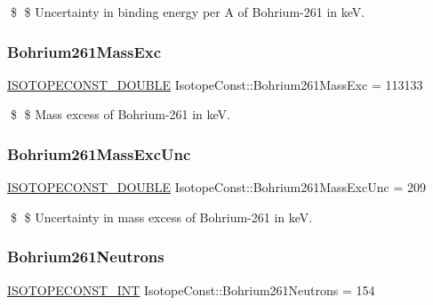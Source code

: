 \$ \$ Uncertainty in binding energy per A of Bohrium-\/261 in keV. \mbox{\label{group___isotope_const-_bohrium-_bh261_gad78b695f15affb44a9869b9024ed9f1d}} 
\subsubsection{\texorpdfstring{Bohrium261\+Mass\+Exc}{Bohrium261MassExc}}
{\footnotesize\ttfamily \mbox{\hyperlink{group___isotope_const-_macros_ga8f45a7272ce02c0b4c65c44636ed719a}{I\+S\+O\+T\+O\+P\+E\+C\+O\+N\+S\+T\+\_\+\+D\+O\+U\+B\+LE}} Isotope\+Const\+::\+Bohrium261\+Mass\+Exc = 113133}

\$ \$ Mass excess of Bohrium-\/261 in keV. \mbox{\label{group___isotope_const-_bohrium-_bh261_ga161111bf28ca32f6d215053b192af9ba}} 
\subsubsection{\texorpdfstring{Bohrium261\+Mass\+Exc\+Unc}{Bohrium261MassExcUnc}}
{\footnotesize\ttfamily \mbox{\hyperlink{group___isotope_const-_macros_ga8f45a7272ce02c0b4c65c44636ed719a}{I\+S\+O\+T\+O\+P\+E\+C\+O\+N\+S\+T\+\_\+\+D\+O\+U\+B\+LE}} Isotope\+Const\+::\+Bohrium261\+Mass\+Exc\+Unc = 209}

\$ \$ Uncertainty in mass excess of Bohrium-\/261 in keV. \mbox{\label{group___isotope_const-_bohrium-_bh261_ga21d69d2935e6b73b3c6c38265e8fb2b4}} 
\subsubsection{\texorpdfstring{Bohrium261\+Neutrons}{Bohrium261Neutrons}}
{\footnotesize\ttfamily \mbox{\hyperlink{group___isotope_const-_macros_ga5f18360b3e99483a35c32d789e62621c}{I\+S\+O\+T\+O\+P\+E\+C\+O\+N\+S\+T\+\_\+\+I\+NT}} Isotope\+Const\+::\+Bohrium261\+Neutrons = 154}

